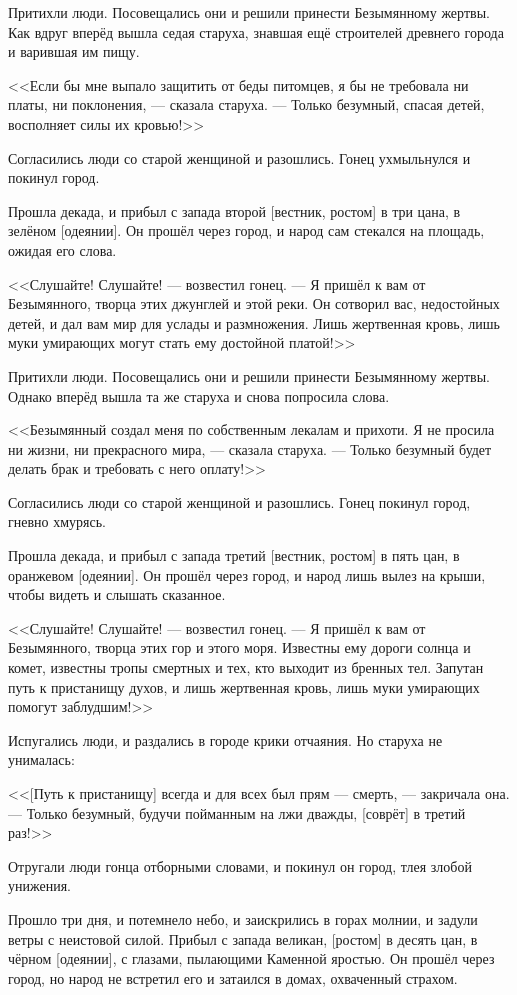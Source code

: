 Притихли люди.
Посовещались они и решили принести Безымянному жертвы.
Как вдруг вперёд вышла седая старуха, знавшая ещё строителей древнего города и варившая им пищу.

<<Если бы мне выпало защитить от беды питомцев, я бы не требовала ни платы, ни поклонения, --- сказала старуха.
--- Только безумный, спасая детей, восполняет силы их кровью!>>

Согласились люди со старой женщиной и разошлись.
Гонец ухмыльнулся и покинул город.

Прошла декада, и прибыл с запада второй [вестник, ростом] в три цана, в зелёном [одеянии].
Он прошёл через город, и народ сам стекался на площадь, ожидая его слова.

<<Слушайте! Слушайте! --- возвестил гонец.
--- Я пришёл к вам от Безымянного, творца этих джунглей и этой реки.
Он сотворил вас, недостойных детей, и дал вам мир для услады и размножения.
Лишь жертвенная кровь, лишь муки умирающих могут стать ему достойной платой!>>

Притихли люди.
Посовещались они и решили принести Безымянному жертвы.
Однако вперёд вышла та же старуха и снова попросила слова.

<<Безымянный создал меня по собственным лекалам и прихоти.
Я не просила ни жизни, ни прекрасного мира, --- сказала старуха.
--- Только безумный будет делать брак и требовать с него оплату!>>

Согласились люди со старой женщиной и разошлись.
Гонец покинул город, гневно хмурясь.

Прошла декада, и прибыл с запада третий [вестник, ростом] в пять цан, в оранжевом [одеянии].
Он прошёл через город, и народ лишь вылез на крыши, чтобы видеть и слышать сказанное.

<<Слушайте! Слушайте! --- возвестил гонец.
--- Я пришёл к вам от Безымянного, творца этих гор и этого моря.
Известны ему дороги солнца и комет, известны тропы смертных и тех, кто выходит из бренных тел.
Запутан путь к пристанищу духов, и лишь жертвенная кровь, лишь муки умирающих помогут заблудшим!>>

Испугались люди, и раздались в городе крики отчаяния.
Но старуха не унималась:

<<[Путь к пристанищу] всегда и для всех был прям --- смерть, --- закричала она.
--- Только безумный, будучи пойманным на лжи дважды, [соврёт] в третий раз!>>

Отругали люди гонца отборными словами, и покинул он город, тлея злобой унижения.

Прошло три дня, и потемнело небо, и заискрились в горах молнии, и задули ветры с неистовой силой.
Прибыл с запада великан, [ростом] в десять цан, в чёрном [одеянии], с глазами, пылающими Каменной яростью.
Он прошёл через город, но народ не встретил его и затаился в домах, охваченный страхом.

